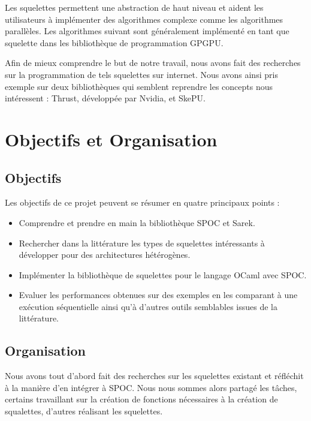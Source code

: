\documentclass{report}
\begin{document}
Les squelettes permettent une abstraction de haut niveau et aident les utilisateurs à implémenter des algorithmes complexe comme les algorithmes parallèles. Les algorithmes suivant sont généralement implémenté en tant que squelette dans les bibliothèque de programmation GPGPU.\newline

Afin de mieux comprendre le but de notre travail, nous avons fait des recherches sur la programmation de tels squelettes sur internet. Nous avons ainsi pris exemple sur deux bibliothèques qui semblent reprendre les concepts nous intéressent : Thrust, développée par Nvidia, et SkePU.\newline



\section{Objectifs et Organisation}
\subsection{Objectifs}
Les objectifs de ce projet peuvent se résumer en quatre principaux points :
\begin{itemize}
\item Comprendre et prendre en main la bibliothèque SPOC et Sarek.
\item Rechercher dans la littérature les types de squelettes intéressants à développer  pour des architectures hétérogènes.
\item Implémenter la bibliothèque de squelettes pour le langage OCaml avec SPOC.
\item Evaluer les performances obtenues sur des exemples en les comparant à une exécution séquentielle ainsi qu'à d'autres outils semblables issues de la littérature. 
\end{itemize}

\subsection{Organisation}

Nous avons tout d'abord fait des recherches sur les squelettes existant et réfléchit à la manière d'en intégrer à SPOC.\newline
Nous nous sommes alors partagé les tâches, certains travaillant sur la création de fonctions nécessaires à la création de squalettes, d'autres réalisant les squelettes.\newline
\end{document}
